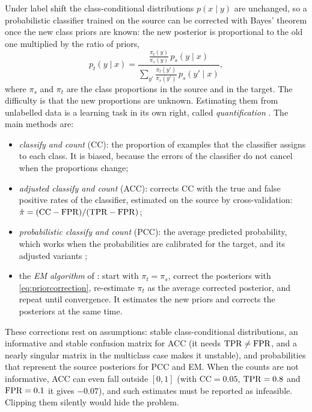 Under label shift the class-conditional distributions $p(x\mid y)$ are unchanged, so a probabilistic classifier
trained on the source can be corrected with Bayes' theorem once the new class priors are known: the new posterior is
proportional to the old one multiplied by the ratio of priors,
\begin{equation}\label{eq:priorcorrection}
  p_t(y\mid x)=\frac{\frac{\pi_t(y)}{\pi_s(y)}\,p_s(y\mid x)}{\sum_{y'}\frac{\pi_t(y')}{\pi_s(y')}\,p_s(y'\mid x)},
\end{equation}
where $\pi_s$ and $\pi_t$ are the class proportions in the source and in the target. The difficulty is that the new
proportions are unknown. Estimating them from unlabelled data is a learning task in its own right, called
\emph{quantification} \citep{forman2008quantifying,gonzalez2017review}. The main methods are:
\begin{itemize}
  \item \emph{classify and count} (CC): the proportion of examples that the classifier assigns to each class. It is
        biased, because the errors of the classifier do not cancel when the proportions change;
  \item \emph{adjusted classify and count} (ACC): corrects CC with the true and false positive rates of the
        classifier, estimated on the source by cross-validation: $\hat\pi=(\mathrm{CC}-\mathrm{FPR})/(\mathrm{TPR}-\mathrm{FPR})$;
  \item \emph{probabilistic classify and count} (PCC): the average predicted probability, which works when the
        probabilities are calibrated for the target, and its adjusted variants \citep{bella2010quantification};
  \item the \emph{EM algorithm} of \citet{saerens2002adjusting}: start with $\pi_t=\pi_s$, correct the posteriors with
        \cref{eq:priorcorrection}, re-estimate $\pi_t$ as the average corrected posterior, and repeat until convergence.
        It estimates the new priors and corrects the posteriors at the same time.
\end{itemize}
These corrections rest on assumptions: stable class-conditional distributions, an informative and stable
confusion matrix for ACC (it needs $\mathrm{TPR}\neq\mathrm{FPR}$, and a nearly singular matrix in the multiclass case makes it
unstable), and probabilities that represent the source posteriors for PCC and EM. When the counts are not
informative, ACC can even fall outside $[0,1]$ (with $\mathrm{CC}=0.05$, $\mathrm{TPR}=0.8$ and $\mathrm{FPR}=0.1$ it gives $-0.07$),
and such estimates must be reported as infeasible. Clipping them silently would hide the problem.

